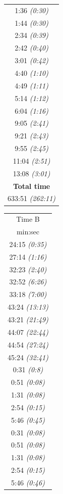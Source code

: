 \documentclass{ieeeaccess}
\begin{document}
\begin{table}[ht]
\begin{tabular}{c}
1:36 \textit{(0:30)} \\ 1:44 \textit{(0:30)} \\ 2:34 \textit{(0:39)} \\ 2:42 \textit{(0:40)} \\ 3:01 \textit{(0:42)} \\ 4:40 \textit{(1:10)} \\ 4:49 \textit{(1:11)} \\ 5:14 \textit{(1:12)} \\ 6:04 \textit{(1:16)} \\ 9:05 \textit{(2:41)} \\ 9:21 \textit{(2:43)} \\ 9:55 \textit{(2:45)} \\ 11:04 \textit{(2:51)} \\ 13:08 \textit{(3:01)} \\ \midrule
\textbf{Total time} \\ 
633:51 \textit{(262:11)} \\ \bottomrule
\end{tabular}%
\begin{tabular}{c}
\toprule
Time B\\
min:sec\\ \midrule
24:15 \textit{(0:35)}\\ 27:14 \textit{(1:16)} \\ 32:23 \textit{(2:40)} \\ 32:52 \textit{(6:26)} \\ 33:18 \textit{(7:00)} \\ 43:24 \textit{(13:13)} \\ 43:21 \textit{(21:49)} \\ 44:07 \textit{(22:44)} \\ 44:54 \textit{(27:24)} \\ 45:24 \textit{(32:41)} \\ 
0:31 \textit{(0:8)} \\ 0:51 \textit{(0:08)} \\ 1:31 \textit{(0:08)} \\ 2:54 \textit{(0:15)} \\ 5:46 \textit{(0:45)} \\
0:31 \textit{(0:08)} \\ 0:51 \textit{(0:08)} \\ 1:31 \textit{(0:08)} \\ 2:54 \textit{(0:15)} \\ 5:46 \textit{(0:46)} \\

\end{tabular}
\end{table}
\end{document}
